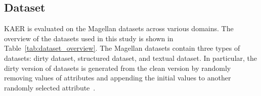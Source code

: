 \subsection{Dataset}

KAER is evaluated on the Magellan datasets \cite{magellandata} across various domains. 
The overview of the datasets used in this study is shown in Table~\ref{tab:dataset_overview}. 
The Magellan datasets contain three types of datasets: dirty dataset, structured dataset, and textual dataset.
In particular, the dirty version of datasets is generated from the clean version by randomly removing values of attributes and appending the initial values to another randomly selected attribute~\cite{li_deep_2020}.

\begin{table}[h]
\centering
{}
\caption{Dataset Summary}
\label{tab:dataset_overview}
\vspace{-0.8cm}
\end{table}







